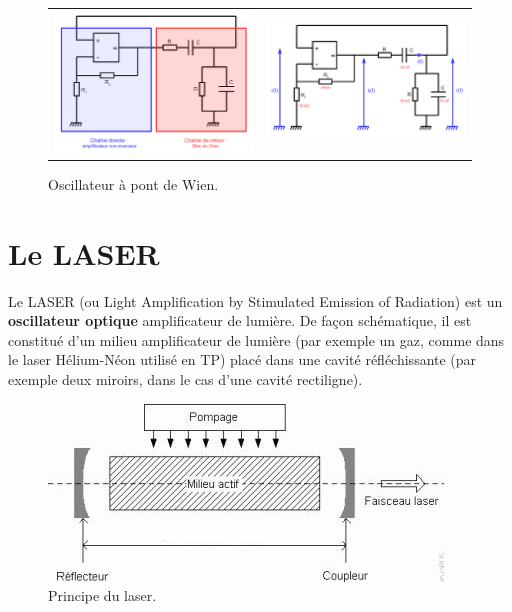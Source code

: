 \documentclass[11pt,a4paper]{report}
\begin{document}
\begin{figure}[h!]
\begin{center}
	\begin{tabular}{cc}
		\includegraphics[scale = 0.6]{wien1.png} &
		\includegraphics[scale = 0.6]{wien2.png} \\
	\end{tabular}
\end{center}
\caption{Oscillateur à pont de Wien.}
\end{figure}

\newpage
\section{Le LASER}

Le LASER (ou Light Amplification by Stimulated Emission of Radiation) est un \textbf{oscillateur optique} amplificateur de lumière. De façon schématique, il est constitué d'un milieu amplificateur de lumière (par exemple un gaz, comme dans le laser Hélium-Néon utilisé en TP) placé dans une cavité réfléchissante (par exemple deux miroirs, dans le cas d'une cavité rectiligne).

\begin{figure}[h!]
\begin{center}
		\includegraphics[scale = 1]{cavite2.png}
\end{center}
\caption{Principe du laser.}
\end{figure}
\end{document}
